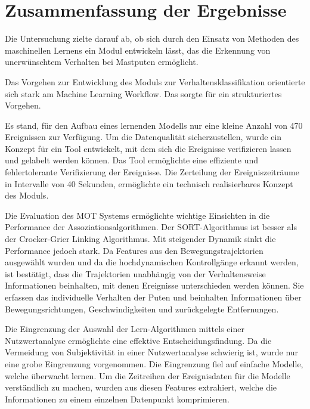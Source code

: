\section{Zusammenfassung der Ergebnisse} \label{sec:Zusammenfassung}
Die Untersuchung zielte darauf ab, ob sich durch den Einsatz von Methoden des maschinellen Lernens ein Modul entwickeln lässt, das die Erkennung von unerwünschtem Verhalten bei Mastputen ermöglicht.

Das Vorgehen zur Entwicklung des Moduls zur Verhaltensklassifikation orientierte sich stark am Machine Learning Workflow. Das sorgte für ein strukturiertes Vorgehen. \par

Es stand, für den Aufbau eines lernenden Modells nur eine kleine Anzahl von 470 Ereignissen zur Verfügung. Um die Datenqualität sicherzustellen, wurde ein Konzept für ein Tool entwickelt, mit dem sich die Ereignisse verifizieren lassen und gelabelt werden können. Das Tool ermöglichte eine effiziente und fehlertolerante Verifizierung der Ereignisse. Die Zerteilung der Ereigniszeiträume in Intervalle von 40 Sekunden, ermöglichte ein technisch realisierbares Konzept des Moduls.\par

Die Evaluation des MOT Systems ermöglichte wichtige Einsichten in die Performance der Assoziationsalgorithmen. Der SORT-Algorithmus ist besser als der Crocker-Grier Linking Algorithmus. Mit steigender Dynamik sinkt die Performance jedoch stark. Da Features aus den Bewegungstrajektorien ausgewählt wurden und da die hochdynamischen Kontrollgänge erkannt werden, ist bestätigt, dass die Trajektorien unabhängig von der Verhaltensweise Informationen beinhalten, mit denen Ereignisse unterschieden werden können. Sie erfassen das individuelle Verhalten der Puten und beinhalten Informationen über Bewegungsrichtungen, Geschwindigkeiten und zurückgelegte Entfernungen.  \par

Die Eingrenzung der Auswahl der Lern-Algorithmen mittels einer Nutzwertanalyse ermöglichte eine effektive Entscheidungsfindung. Da die Vermeidung von Subjektivität in einer Nutzwertanalyse schwierig ist, wurde nur eine grobe Eingrenzung vorgenommen. Die Eingrenzung fiel auf einfache Modelle, welche überwacht lernen. Um die Zeitreihen der Ereignisdaten für die Modelle verständlich zu machen, wurden aus diesen Features extrahiert, welche die Informationen zu einem einzelnen Datenpunkt komprimieren. \par

